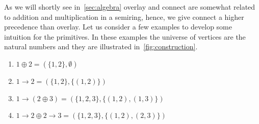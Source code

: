 \documentclass{article}
\newcommand{\overlay}{\oplus}
\newcommand{\connect}{\rightarrow}
\begin{document}
As we will shortly see in~\autoref{sec:algebra} overlay and connect are somewhat
related to addition and multiplication in a semiring, hence, we give connect a
higher precedence
than overlay. Let us consider a few examples to develop some intuition for the
primitives. In these examples the universe of vertices are the natural numbers
and they are illustrated in~\autoref{fig:construction}.
\begin{enumerate}[label=(\alph*)]
\item $1 \overlay 2 = (\{1,2\}, \emptyset)$
\item $1 \connect 2 = (\{1,2\}, \{(1,2)\})$
\item $1 \connect (2 \overlay 3) = (\{1,2,3\}, \{(1,2), (1,3)\})$
\item $1 \connect 2 \overlay 2 \connect 3 = (\{1,2,3\}, \{(1,2), (2,3)\})$
\end{enumerate}
\end{document}
